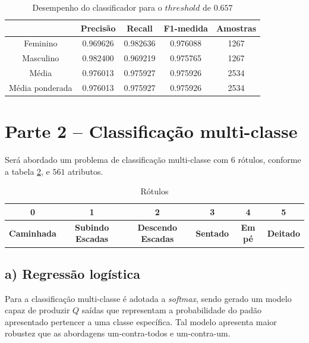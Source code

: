 \documentclass{article}
\begin{document}
    \begin{table}[]
        \begin{tabular}{ccccc}
        \hline
        \textbf{} & \textbf{Precisão} & \textbf{Recall} & \textbf{F1-medida} & \textbf{Amostras} \\ \hline
        \multicolumn{1}{c|}{Feminino} & \multicolumn{1}{c|}{0.969626} & \multicolumn{1}{c|}{0.982636} & \multicolumn{1}{c|}{0.976088} & \multicolumn{1}{c|}{1267} \\ \cline{2-5} 
        \multicolumn{1}{c|}{Masculino} & \multicolumn{1}{c|}{0.982400} & \multicolumn{1}{c|}{0.969219} & \multicolumn{1}{c|}{0.975765} & \multicolumn{1}{c|}{1267} \\ \cline{2-5} 
        \multicolumn{1}{c|}{Média} & \multicolumn{1}{c|}{0.976013} & \multicolumn{1}{c|}{0.975927} & \multicolumn{1}{c|}{0.975926} & \multicolumn{1}{c|}{2534} \\ \cline{2-5} 
        \multicolumn{1}{c|}{Média ponderada} & \multicolumn{1}{c|}{0.976013} & \multicolumn{1}{c|}{0.975927} & \multicolumn{1}{c|}{0.975926} & \multicolumn{1}{c|}{2534} \\ \hline
        \end{tabular}
        \caption{Desempenho do classificador para o $threshold$ de $0.657$}
        \label{table:ex1_desempenho}
    \end{table}
    
    \section[]{Parte 2 – Classificação multi-classe}
    Será abordado um problema de classificação multi-classe com $6$ rótulos, conforme a tabela \ref{table:ex2_rotulos}, e $561$ atributos.
    \begin{table}[]
        \begin{tabular}{|c|c|c|c|c|c|}
        \hline
        0 & 1 & 2 & 3 & 4 & \textbf{5} \\ \hline
        \textbf{Caminhada} & \textbf{Subindo Escadas} & \textbf{Descendo Escadas} & \textbf{Sentado} & \textbf{Em pé} & \textbf{Deitado} \\ \hline
        \end{tabular}
        \caption{Rótulos}
        \label{table:ex2_rotulos}
    \end{table}
    \subsection[]{a) Regressão logística}
    Para a classificação multi-classe é adotada a \textit{softmax}, sendo gerado um modelo capaz de produzir $Q$
    saídas que representam a probabilidade do padão apresentado pertencer a uma classe específica. Tal modelo apresenta
    maior robustez que as abordagens um-contra-todos e um-contra-um.
\end{document}
